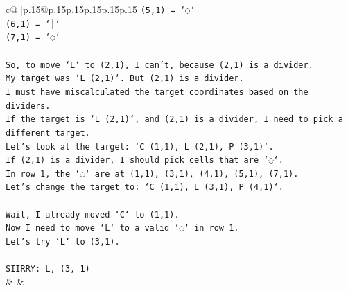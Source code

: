 \documentclass{article}
\begin{document}
{\begin{supertabular}{c@{$\;$}|p{.15\linewidth}@{}p{.15\linewidth}p{.15\linewidth}p{.15\linewidth}p{.15\linewidth}p{.15\linewidth}}
{{{\texttt{(5,1) = `◌`} \\
\texttt{(6,1) = `│`} \\
\texttt{(7,1) = `◌`} \\
\\ 
\texttt{So, to move `L` to (2,1), I can't, because (2,1) is a divider.} \\
\texttt{My target was `L (2,1)`. But (2,1) is a divider.} \\
\texttt{I must have miscalculated the target coordinates based on the dividers.} \\
\texttt{If the target is `L (2,1)`, and (2,1) is a divider, I need to pick a different target.} \\
\texttt{Let's look at the target: `C (1,1), L (2,1), P (3,1)`.} \\
\texttt{If (2,1) is a divider, I should pick cells that are `◌`.} \\
\texttt{In row 1, the `◌` are at (1,1), (3,1), (4,1), (5,1), (7,1).} \\
\texttt{Let's change the target to: `C (1,1), L (3,1), P (4,1)`.} \\
\\ 
\texttt{Wait, I already moved `C` to (1,1).} \\
\texttt{Now I need to move `L` to a valid `◌` in row 1.} \\
\texttt{Let's try `L` to (3,1).} \\
\\ 
\texttt{SIIRRY: L, (3, 1)} \\
            }
        }
    }
    & & \\ \\


\end{supertabular}}
\end{document}
